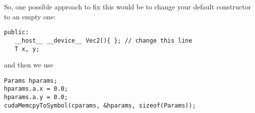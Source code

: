 So, one possible approach to fix this would be to change your default
constructor to an empty one:
\begin{verbatim}
public:
   __host__ __device__ Vec2(){ }; // change this line
   T x, y;
\end{verbatim}
and then we use
\begin{verbatim}
Params hparams;
hparams.a.x = 0.0;
hparams.a.y = 0.0;
cudaMemcpyToSymbol(cparams, &hparams, sizeof(Params));
\end{verbatim}
